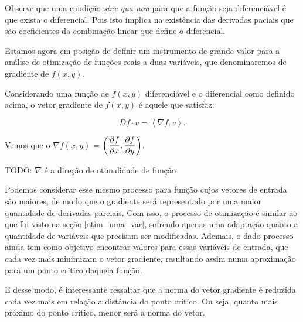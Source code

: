 Observe que uma condição \textit{sine qua non} para que a função seja
diferenciável é que exista o diferencial. Pois isto implica na existência das
derivadas paciais que são coeficientes da combinação linear que define o
diferencial.

Estamos agora em posição de definir um instrumento de grande valor para a
análise de otimização de funções reais a duas variáveis, que denominaremos de
gradiente de $f(x, y)$.

\begin{definition}[Gradiente de $f(x, y)$]

    Considerando uma função de $f(x, y)$ diferenciável e o diferencial como
    definido acima, o vetor gradiente de $f(x, y)$ é aquele que satisfaz:

    \begin{equation}
        Df \cdot v = \left\langle \nabla f, v \right\rangle.
    \end{equation}

    Vemos que o $\nabla f(x, y)$ = $\left(\displaystyle{\frac{\partial f}{\partial x}}, \displaystyle{\frac{\partial f}{\partial y}}\right)$.


\end{definition}

    \begin{proposition}
        TODO: $\nabla$ é a direção de otimalidade de função
    \end{proposition}


Podemos considerar esse mesmo processo para função cujos vetores de entrada são
maiores, de modo que o gradiente será representado por uma maior quantidade de
derivadas parciais. Com isso, o processo de otimização é similar ao que foi
visto na seção \ref{otim_uma_var}, sofrendo apenas uma adaptação quanto a
quantidade de variáveis que precisam ser modificadas. Ademais, o dado processo
ainda tem como objetivo encontrar valores para essas variáveis de entrada, que
cada vez mais minimizam o vetor gradiente, resultando assim numa aproximação
para um ponto crítico daquela função.

E desse modo, é interessante ressaltar que a norma do vetor gradiente é reduzida
cada vez mais em relação a distância do ponto crítico. Ou seja, quanto mais
próximo do ponto crítico, menor será a norma do vetor.

